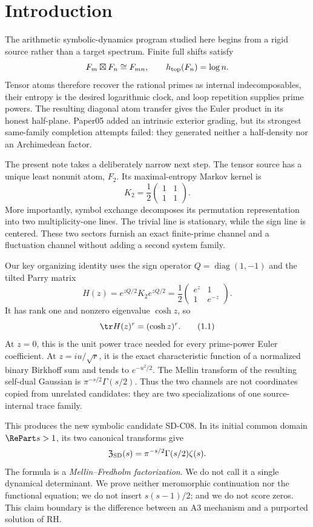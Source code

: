 \section{Introduction}
\label{sec:introduction}

The arithmetic symbolic-dynamics program studied here begins from a rigid
source rather than a target spectrum. Finite full shifts satisfy
\[
 F_m\boxtimes F_n\cong F_{mn},\qquad h_{\rm top}(F_n)=\log n.
\]
Tensor atoms therefore recover the rational primes as internal
indecomposables, their entropy is the desired logarithmic clock, and loop
repetition supplies prime powers. The resulting diagonal atom transfer gives
the Euler product in its honest half-plane. Paper05 added an intrinsic
exterior grading, but its strongest same-family completion attempts failed:
they generated neither a half-density nor an Archimedean factor.

The present note takes a deliberately narrow next step. The tensor source has
a unique least nonunit atom, $F_2$. Its maximal-entropy Markov kernel is
\[
 K_2=\frac12\begin{pmatrix}1&1\\1&1\end{pmatrix}.
\]
More importantly, symbol exchange decomposes its permutation representation
into two multiplicity-one lines. The trivial line is stationary, while the
sign line is centered. These two sectors furnish an exact finite-prime
channel and a fluctuation channel without adding a second system family.

Our key organizing identity uses the sign operator
$Q=\operatorname{diag}(1,-1)$ and the tilted Parry matrix
\[
 H(z)=e^{zQ/2}K_2e^{zQ/2}
 =\frac12\begin{pmatrix}e^z&1\\1&e^{-z}\end{pmatrix}.
\]
It has rank one and nonzero eigenvalue $\cosh z$, so
\[
 \tr H(z)^r=(\cosh z)^r.                     \tag{1.1}
\]
At $z=0$, this is the unit power trace needed for every prime-power Euler
coefficient. At $z=iu/\sqrt r$, it is the exact characteristic function of a
normalized binary Birkhoff sum and tends to $e^{-u^2/2}$. The Mellin transform
of the resulting self-dual Gaussian is $\pi^{-s/2}\Gamma(s/2)$. Thus the two
channels are not coordinates copied from unrelated candidates: they are two
specializations of one source-internal trace family.



This produces the new symbolic candidate SD-C08. In its initial common domain
$\RePart s>1$, its two canonical transforms give
\[
 \mathfrak Z_{\rm SD}(s)
 =\pi^{-s/2}\Gamma(s/2)\zeta(s).
\]
The formula is a \emph{Mellin--Fredholm factorization}. We do not call it a
single dynamical determinant. We prove neither meromorphic continuation nor
the functional equation; we do not insert $s(s-1)/2$; and we do not score
zeros. This claim boundary is the difference between an A3 mechanism and a
purported solution of RH.

